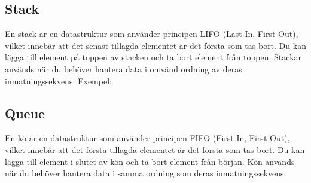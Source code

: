 \hypertarget{stack}{%
\subsection{Stack}\label{stack}}

En stack är en datastruktur som använder principen LIFO (Last In, First
Out), vilket innebär att det senast tillagda elementet är det första som
tas bort. Du kan lägga till element på toppen av stacken och ta bort
element från toppen. Stackar används när du behöver hantera data i
omvänd ordning av deras inmatningssekvens. Exempel:

\hypertarget{cb3}{}
\begin{Shaded}
\begin{Highlighting}[]
\OperatorTok{\textless{}}\OperatorTok{\textgreater{}}\OperatorTok{=}  \OperatorTok{\textless{}\textgreater{}();}
\OperatorTok{(}\OperatorTok{);}
\OperatorTok{(}\OperatorTok{);}
\OperatorTok{(}\OperatorTok{);}
\OperatorTok{(}\OperatorTok{());}  
\end{Highlighting}
\end{Shaded}

\hypertarget{queue}{%
\subsection{Queue}\label{queue}}

En kö är en datastruktur som använder principen FIFO (First In, First
Out), vilket innebär att det första tillagda elementet är det första som
tas bort. Du kan lägga till element i slutet av kön och ta bort element
från början. Kön används när du behöver hantera data i samma ordning som
deras inmatningssekvens.

\hypertarget{cb4}{}
\begin{Shaded}
\begin{Highlighting}[]
\OperatorTok{\textless{}}\OperatorTok{\textgreater{}}\OperatorTok{=}  \OperatorTok{\textless{}\textgreater{}();}
\OperatorTok{(}\OperatorTok{);}
\OperatorTok{(}\OperatorTok{);}
\OperatorTok{(}\OperatorTok{);}
\OperatorTok{(}\OperatorTok{());}  
\end{Highlighting}
\end{Shaded}

